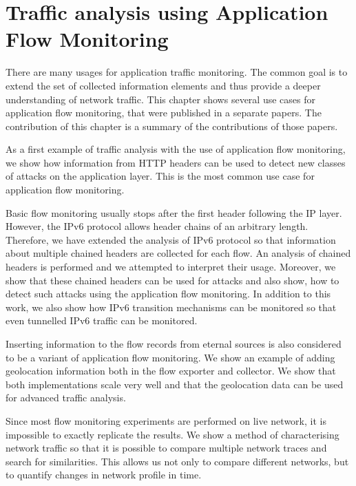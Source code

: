 \chapter{Traffic analysis using Application Flow Monitoring}\label{chap:traffic-analysis-using-application-flow-monitoring}

\begin{chapintro}

There are many usages for application traffic monitoring. The common goal is to extend the set of collected information elements and thus provide a deeper understanding of network traffic. This chapter shows several use cases for application flow monitoring, that were published in a separate papers. The contribution of this chapter is a summary of the contributions of those papers.

As a first example of traffic analysis with the use of application flow monitoring, we show how information from HTTP headers can be used to detect new classes of attacks on the application layer. This is the most common use case for application flow monitoring. 

Basic flow monitoring usually stops after the first header following the IP layer. However, the IPv6 protocol allows header chains of an arbitrary length. Therefore, we have extended the analysis of IPv6 protocol so that information about multiple chained headers are collected for each flow. An analysis of chained headers is performed and we attempted to interpret their usage. Moreover, we show that these chained headers can be used for attacks and also show, how to detect such attacks using the application flow monitoring. In addition to this work, we also show how IPv6 transition mechanisms can be monitored so that even tunnelled IPv6 traffic can be monitored.

Inserting information to the flow records from eternal sources is also considered to be a variant of application flow monitoring. We show an example of adding geolocation information both in the flow exporter and collector. We show that both implementations scale very well and that the geolocation data can be used for advanced traffic analysis.

Since most flow monitoring experiments are performed on live network, it is impossible to exactly replicate the results. We show a method of characterising network traffic so that it is possible to compare multiple network traces and search for similarities. This allows us not only to compare different networks, but to quantify changes in network profile in time.


\end{chapintro}
